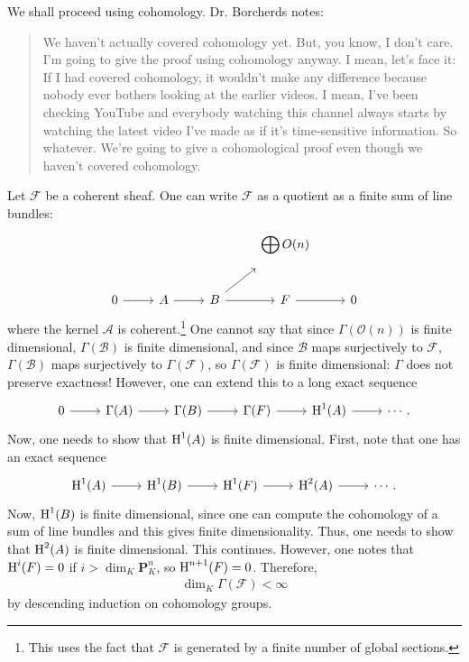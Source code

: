 \documentclass [11 pt, oneside] {article}
\begin{document}
We shall proceed using cohomology. Dr. Borcherds notes:
\begin{quote}
	\small We haven't actually covered cohomology yet. But, you know, I don't care. I'm going to give the proof using cohomology anyway. I mean, let's face it: If I had covered cohomology, it wouldn't make any difference because nobody ever bothers looking at the earlier videos. I mean, I've been checking YouTube and everybody watching this channel always starts by watching the latest video I've made as if it's time-sensitive information. So whatever. We're going to give a cohomological proof even though we haven't covered cohomology.
\end{quote}
Let $\mathscr{F}$ be a coherent sheaf. One can write $\mathscr{F}$ as a quotient as a finite sum of line bundles:
\[
\begin{tikzcd}
	&&& \displaystyle\bigoplus_{}\mathscr{O}(n)\\
	0\ar[r]& \mathscr{A}\ar[r]&\mathscr{B}\ar[r]\ar[ur] &\mathscr{F}\ar[r]&0
\end{tikzcd}
\]
where the kernel $\mathscr{A}$ is coherent.\footnote{This uses the fact that $\mathscr{F}$ is generated by a finite number of global sections.} One cannot say that since $\Gamma(\mathscr{O}(n))$ is finite dimensional, $\Gamma(\mathscr{B})$ is finite dimensional, and since $\mathscr{B}$ maps surjectively to $\mathscr{F}$, $\Gamma(\mathscr{B})$ maps surjectively to $\Gamma(\mathscr{F})$, so $\Gamma(\mathscr{F})$ is finite dimensional: $\Gamma$ does not preserve exactness! However, one can extend this to a long exact sequence
\[
\begin{tikzcd}
	0\ar[r]&\Gamma(\mathscr{A}) \ar[r]&\Gamma(\mathscr{B}) \ar[r]&\Gamma(\mathscr{F}) \ar[r] & \HH^1(\mathscr{A}) \ar[r]&\cdots.
\end{tikzcd}
\]
Now, one needs to show that $\operatorname{H}^1(\relax{A})$ is finite dimensional. First, note that one has an exact sequence
\[
\begin{tikzcd}
	\HH^1(\mathscr{A}) \ar[r]&\HH^1(\mathscr{B}) \ar[r]&\HH^1(\mathscr{F}) \ar[r]&\HH^2(\mathscr{A}) \ar[r]&\cdots.
\end{tikzcd}
\]
Now, $\operatorname{H}^1(\relax{B})$ is finite dimensional, since one can compute the cohomology of a sum of line bundles and this gives finite dimensionality. Thus, one needs to show that $\operatorname{H}^2(\relax{A})$ is finite dimensional. This continues. However, one notes that $\operatorname{H}^{i}(\relax{F}) =0$ if $i>\dim_K \mathbf{P}^n_K$, so $\operatorname{H}^{n+1}(\relax{F}) =0$. Therefore, 
\begin{align*}
	\dim_K \Gamma(\mathscr{F}) <\infty
\end{align*}
by descending induction on cohomology groups.
\end{document}
